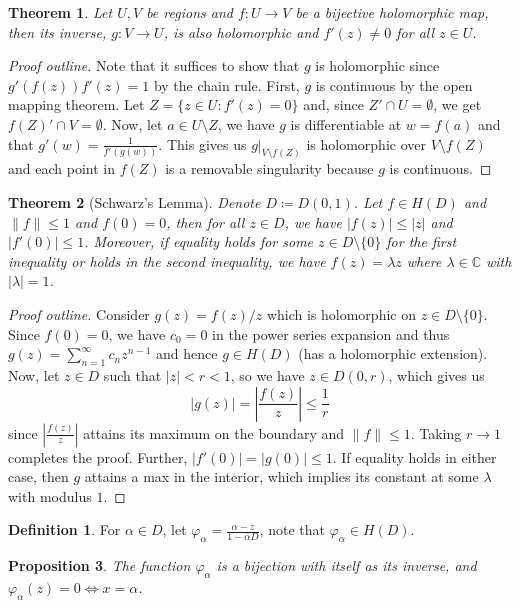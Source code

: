 \documentclass[letterpaper,12pt]{article}
\theoremstyle{definition}
\newtheorem{definition}{Definition}[section]
\theoremstyle{plain}
\newtheorem{thm}{Theorem}[section]
\newtheorem{proposition}[thm]{Proposition}
\theoremstyle{remark}
\newcommand{\C}{\mathbb{C}}
\begin{document}
\begin{thm}
Let $U,V$ be regions and $f:U\to V$ be a bijective holomorphic map, then its inverse, $g:V\to U$, is also holomorphic and $f'(z)\ne 0$ for all $z\in U$.
\end{thm}

\begin{proof}[Proof outline]
Note that it suffices to show that $g$ is holomorphic since $g'(f(z))f'(z)=1$ by the chain rule. First, $g$ is continuous by the open mapping theorem. Let $Z = \{z\in U:f'(z) = 0\}$ and, since $Z'\cap U = \emptyset$, we get $f(Z)'\cap V = \emptyset$. Now, let $a\in U\setminus Z$, we have $g$ is differentiable at $w=f(a)$ and that $g'(w) = \frac{1}{f'(g(w))}$. This gives us $g\vert_{V\setminus f(Z)}$ is holomorphic over $V\setminus f(Z)$ and each point in $f(Z)$ is a removable singularity because $g$ is continuous.
\end{proof}

\begin{thm}[Schwarz's Lemma]
Denote $D\coloneqq D(0,1)$. Let $f\in H(D)$ and $\|f\|\leq 1$ and $f(0) = 0$, then for all $z\in D$, we have $|f(z)|\leq |z|$ and $|f'(0)|\leq 1$. Moreover, if equality holds for some $z\in D\setminus\{0\}$ for the first inequality or holds in the second inequality, we have $f(z) = \lambda z$ where $\lambda\in\C$ with $|\lambda|=1$.
\end{thm}

\begin{proof}[Proof outline]
Consider $g(z) = f(z)/z$ which is holomorphic on $z\in D\setminus\{0\}$. Since $f(0) = 0$, we have $c_0 = 0$ in the power series expansion and thus $g(z) = \sum_{n=1}^\infty c_nz^{n-1}$ and hence $g\in H(D)$ (has a holomorphic extension). Now, let $z\in D$ such that $|z|<r<1$, so we have $z\in D(0,r)$, which gives us
\[|g(z)| = \left|\frac{f(z)}{z}\right|\leq \frac1r\]
since $\left|\frac{f(z)}{z}\right|$ attains its maximum on the boundary and $\|f\|\leq 1$. Taking $r\to 1$ completes the proof. Further, $|f'(0)| = |g(0)| \leq 1$. If equality holds in either case, then $g$ attains a max in the interior, which implies its constant at some $\lambda$ with modulus $1$.
\end{proof}

\begin{definition}
For $\alpha\in D$, let $\varphi_\alpha = \frac{\alpha-z}{1-\bar{\alpha}D}$, note that $\varphi_\alpha\in H(D)$.
\end{definition}

\begin{proposition}
The function $\varphi_\alpha$ is a bijection with itself as its inverse, and $\varphi_\alpha(z) = 0 \iff x=\alpha$.
\end{proposition}
\end{document}
